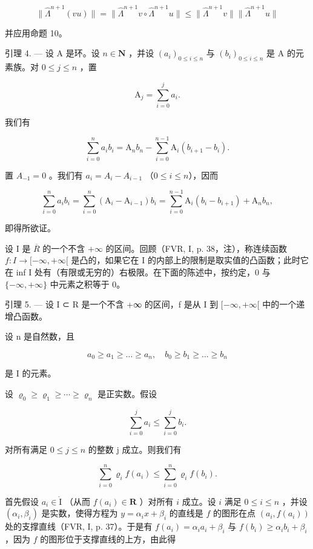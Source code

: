 \[
\| \widehat {\Lambda} ^ {n + 1} (v u) \| = \| \widehat {\Lambda} ^ {n + 1} v \circ \widehat {\Lambda} ^ {n + 1} u \| \leqslant \| \widehat {\Lambda} ^ {n + 1} v \| \| \widehat {\Lambda} ^ {n + 1} u \|
\]

并应用命题 10。

引理 4. --- 设 A 是环。设 \(n \in \mathbf{N}\) ，并设 \((a_i)_{0 \leqslant i \leqslant n}\) 与 \((b_i)_{0 \leqslant i \leqslant n}\) 是 A 的元素族。对 \(0 \leqslant j \leqslant n\) ，置

\[
\mathrm{A} _ {j} = \sum_ {i = 0} ^ {j} a _ {i}.
\]

我们有

\[
\sum_ {i = 0} ^ {n} a _ {i} b _ {i} = \mathrm{A} _ {n} b _ {n} - \sum_ {i = 0} ^ {n - 1} \mathrm{A} _ {i} (b _ {i + 1} - b _ {i}).
\]

置 \(A_{-1}=0\) 。我们有 \(a_{i}=A_{i}-A_{i-1}\) （\(0\leqslant i\leqslant n\)），因而

\[
\sum_ {i = 0} ^ {n} a _ {i} b _ {i} = \sum_ {i = 0} ^ {n} (\mathrm{A} _ {i} - \mathrm{A} _ {i - 1}) b _ {i} = \sum_ {i = 0} ^ {n - 1} \mathrm{A} _ {i} (b _ {i} - b _ {i + 1}) + \mathrm{A} _ {n} b _ {n},
\]

即得所欲证。

设 I 是 \(\overline{R}\) 的一个不含 \(+\infty\) 的区间。回顾（FVR, I, p. 38，注），称连续函数 \(f: I \to [-\infty, +\infty[\) 是凸的，如果它在 I 的内部上的限制是取实值的凸函数；此时它在 inf I 处有（有限或无穷的）右极限。在下面的陈述中，按约定，0 与 \(\{-\infty, +\infty\}\) 中元素之积等于 0。

引理 5. --- 设 I ⊂ R 是一个不含 +∞ 的区间，f 是从 I 到 \([-\infty, +\infty[\) 中的一个递增凸函数。

设 n 是自然数，且

\[
a _ {0} \geqslant a _ {1} \geqslant \dots \geqslant a _ {n}, \quad b _ {0} \geqslant b _ {1} \geqslant \dots \geqslant b _ {n}
\]

是 I 的元素。

设 \(\varrho_{0} \geqslant \varrho_{1} \geqslant \cdots \geqslant \varrho_{n}\) 是正实数。假设

\[
\sum_ {i = 0} ^ {j} a _ {i} \leqslant \sum_ {i = 0} ^ {j} b _ {i}.\tag{5}
\]

对所有满足 \(0 \leqslant j \leqslant n\) 的整数 j 成立。则我们有

\[
\sum_ {i = 0} ^ {n} \varrho_ {i} f (a _ {i}) \leqslant \sum_ {i = 0} ^ {n} \varrho_ {i} f (b _ {i}).\tag{6}
\]

首先假设 \(a_i \in \mathring{\mathrm{I}}\) （从而 \(f(a_i) \in \mathbf{R}\) ）对所有 \(i\) 成立。设 \(i\) 满足 \(0 \leqslant i \leqslant n\) ，并设 \((\alpha_i, \beta_i)\) 是实数，使得方程为 \(y = \alpha_i x + \beta_i\) 的直线是 \(f\) 的图形在点 \((a_i, f(a_i))\) 处的支撑直线（FVR, I, p. 37）。于是有 \(f(a_i) = \alpha_i a_i + \beta_i\) 与 \(f(b_i) \geqslant \alpha_i b_i + \beta_i\) ，因为 \(f\) 的图形位于支撑直线的上方，由此得

